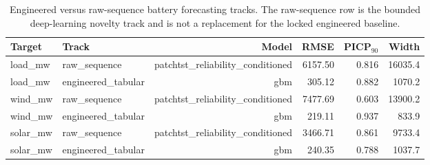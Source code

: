 \begin{table}[ht]
\centering
\caption{Engineered versus raw-sequence battery forecasting tracks. The raw-sequence row is the bounded deep-learning novelty track and is not a replacement for the locked engineered baseline.}
\label{tab:battery-raw-sequence-track}
\begin{tabular}{llrrrr}
\toprule
Target & Track & Model & RMSE & PICP$_{90}$ & Width \\
\midrule
load\_mw & raw\_sequence & patchtst\_reliability\_conditioned & 6157.50 & 0.816 & 16035.4 \\
load\_mw & engineered\_tabular & gbm & 305.12 & 0.882 & 1070.2 \\
wind\_mw & raw\_sequence & patchtst\_reliability\_conditioned & 7477.69 & 0.603 & 13900.2 \\
wind\_mw & engineered\_tabular & gbm & 219.11 & 0.937 & 833.9 \\
solar\_mw & raw\_sequence & patchtst\_reliability\_conditioned & 3466.71 & 0.861 & 9733.4 \\
solar\_mw & engineered\_tabular & gbm & 240.35 & 0.788 & 1037.7 \\
\bottomrule
\end{tabular}
\end{table}
